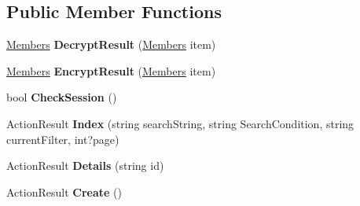 \subsection*{Public Member Functions}
\begin{DoxyCompactItemize}
\item 
\hyperlink{class_cloud_bread_admin_web_1_1_members}{Members} {\bfseries Decrypt\+Result} (\hyperlink{class_cloud_bread_admin_web_1_1_members}{Members} item)\hypertarget{class_cloud_bread_admin_web_1_1_controllers_1_1_members_controller_a48d4db5cd0226332091372d96645da00}{}\label{class_cloud_bread_admin_web_1_1_controllers_1_1_members_controller_a48d4db5cd0226332091372d96645da00}

\item 
\hyperlink{class_cloud_bread_admin_web_1_1_members}{Members} {\bfseries Encrypt\+Result} (\hyperlink{class_cloud_bread_admin_web_1_1_members}{Members} item)\hypertarget{class_cloud_bread_admin_web_1_1_controllers_1_1_members_controller_acdb55df82bf06c3c8d276b4f48a6c100}{}\label{class_cloud_bread_admin_web_1_1_controllers_1_1_members_controller_acdb55df82bf06c3c8d276b4f48a6c100}

\item 
bool {\bfseries Check\+Session} ()\hypertarget{class_cloud_bread_admin_web_1_1_controllers_1_1_members_controller_a65c99342c001f825d717f1a7533c188d}{}\label{class_cloud_bread_admin_web_1_1_controllers_1_1_members_controller_a65c99342c001f825d717f1a7533c188d}

\item 
Action\+Result {\bfseries Index} (string search\+String, string Search\+Condition, string current\+Filter, int?page)\hypertarget{class_cloud_bread_admin_web_1_1_controllers_1_1_members_controller_a2bd03c681454412335c7c640a18bf310}{}\label{class_cloud_bread_admin_web_1_1_controllers_1_1_members_controller_a2bd03c681454412335c7c640a18bf310}

\item 
Action\+Result {\bfseries Details} (string id)\hypertarget{class_cloud_bread_admin_web_1_1_controllers_1_1_members_controller_af39759700dc355ea52b4ff0e9e1a5da0}{}\label{class_cloud_bread_admin_web_1_1_controllers_1_1_members_controller_af39759700dc355ea52b4ff0e9e1a5da0}

\item 
Action\+Result {\bfseries Create} ()\hypertarget{class_cloud_bread_admin_web_1_1_controllers_1_1_members_controller_abfb2c19c8dc27ee47e2e8c1fa0ab4c3c}{}\label{class_cloud_bread_admin_web_1_1_controllers_1_1_members_controller_abfb2c19c8dc27ee47e2e8c1fa0ab4c3c}


\end{DoxyCompactItemize}

